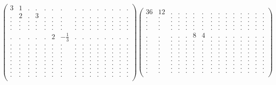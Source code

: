 \documentclass[12pt,a4paper]{amsart}
\begin{document}
\begin{align*}
\left(\begin{array}{rrrrrrrrrrrrrrr}%
3&1&.&.&.&.&.&.&.&.&.&.&.&.&.\\%
.&2&.&3&.&.&.&.&.&.&.&.&.&.&.\\%
.&.&.&.&.&.&.&.&.&.&.&.&.&.&.\\%
.&.&.&.&.&.&.&.&.&.&.&.&.&.&.\\%
.&.&.&.&.&.&.&.&.&.&.&.&.&.&.\\%
.&.&.&.&.&2&-\frac13&.&.&.&.&.&.&.&.\\%
.&.&.&.&.&.&.&.&.&.&.&.&.&.&.\\%
.&.&.&.&.&.&.&.&.&.&.&.&.&.&.\\%
.&.&.&.&.&.&.&.&.&.&.&.&.&.&.\\%
.&.&.&.&.&.&.&.&.&.&.&.&.&.&.\\%
.&.&.&.&.&.&.&.&.&.&.&.&.&.&.\\%
.&.&.&.&.&.&.&.&.&.&.&.&.&.&.\\%
.&.&.&.&.&.&.&.&.&.&.&.&.&.&.\\%
.&.&.&.&.&.&.&.&.&.&.&.&.&.&.\\%
.&.&.&.&.&.&.&.&.&.&.&.&.&.&.\\%
\end{array}\right)%
\left(\begin{array}{rrrrrrrrrrrrrrr}%
36&12&.&.&.&.&.&.&.&.&.&.&.&.&.\\%
.&.&.&.&.&.&.&.&.&.&.&.&.&.&.\\%
.&.&.&.&.&.&.&.&.&.&.&.&.&.&.\\%
.&.&.&.&.&.&.&.&.&.&.&.&.&.&.\\%
.&.&.&.&.&.&.&.&.&.&.&.&.&.&.\\%
.&.&.&.&.&8&4&.&.&.&.&.&.&.&.\\%
.&.&.&.&.&.&.&.&.&.&.&.&.&.&.\\%
.&.&.&.&.&.&.&.&.&.&.&.&.&.&.\\%
.&.&.&.&.&.&.&.&.&.&.&.&.&.&.\\%
.&.&.&.&.&.&.&.&.&.&.&.&.&.&.\\%
.&.&.&.&.&.&.&.&.&.&.&.&.&.&.\\%
.&.&.&.&.&.&.&.&.&.&.&.&.&.&.\\%
.&.&.&.&.&.&.&.&.&.&.&.&.&.&.\\%
.&.&.&.&.&.&.&.&.&.&.&.&.&.&.\\%
.&.&.&.&.&.&.&.&.&.&.&.&.&.&.\\%
\end{array}\right)%
\end{align*}
\end{document}
